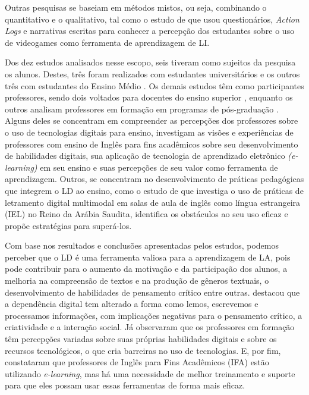 Outras pesquisas se baseiam em métodos mistos, ou seja, combinando o
quantitativo e o qualitativo, tal como o estudo de \textcite{valadares2021videogames} que usou questionários, \emph{Action Logs} e narrativas escritas
para conhecer a percepção dos estudantes sobre o uso de videogames como
ferramenta de aprendizagem de LI.

Dos dez estudos analisados nesse escopo, seis tiveram como sujeitos da
pesquisa os alunos. Destes, três foram realizados com estudantes
universitários \cite{roche2017assessing,bozavli2021foreign,valadares2021videogames} e
os outros três com estudantes do Ensino Médio \cite{oliveira2018multiletramentos,xavier2019construcao,cladis2020shifting}. Os demais estudos têm
como participantes professores, sendo dois voltados para docentes do
ensino superior \cite{dhillon2021investigation,almusharraf2020postsecondary},
enquanto os outros analisam professores em formação em programas de
pós-graduação \cite{krajka2021,campbell2020developing}. Alguns deles se
concentram em compreender as percepções dos professores sobre o uso de
tecnologias digitais para ensino, \textcite{dhillon2021investigation} investigam as
visões e experiências de professores com ensino de Inglês para fins
acadêmicos sobre seu desenvolvimento de habilidades digitais, sua
aplicação de tecnologia de aprendizado eletrônico \emph{(e-learning)} em
seu ensino e suas percepções de seu valor como ferramenta de
aprendizagem. Outros, se concentram no desenvolvimento de práticas
pedagógicas que integrem o LD ao ensino, como o estudo de \textcite{almusharraf2020postsecondary} que investiga o uso de práticas de letramento digital
multimodal em salas de aula de inglês como língua estrangeira (IEL) no
Reino da Arábia Saudita, identifica os obstáculos ao seu uso eficaz e
propõe estratégias para superá-los.

Com base nos resultados e conclusões apresentadas pelos
estudos, podemos perceber que o LD é uma ferramenta valiosa
para a aprendizagem de LA, pois pode contribuir para o aumento da
motivação e da participação dos alunos, a melhoria na compreensão de
textos e na produção de gêneros textuais, o desenvolvimento de
habilidades de pensamento crítico entre outras. \textcite{cladis2020shifting} destacou
que a dependência digital tem alterado a forma como lemos, escrevemos e
processamos informações, com implicações negativas para o pensamento
crítico, a criatividade e a interação social. Já \textcite{campbell2020developing}
observaram que os professores em formação têm percepções variadas sobre
suas próprias habilidades digitais e sobre os recursos tecnológicos, o
que cria barreiras no uso de tecnologias. E, por fim, \textcite{dhillon2021investigation} constataram que professores de Inglês para Fins Acadêmicos (IFA)
estão utilizando \emph{e-learning}, mas há uma necessidade de melhor
treinamento e suporte para que eles possam usar essas ferramentas de
forma mais eficaz.


